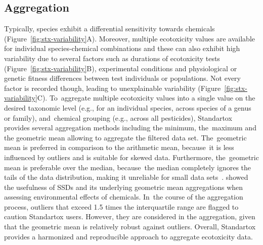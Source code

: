 \documentclass[data,datadescriptor,accept,moreauthors,pdftex]{Definitions/mdpi}
\begin{document}
\subsection{Aggregation}
Typically, species exhibit a differential sensitivity towards chemicals (Figure~\ref{fig:stx-variability}A). Moreover, multiple ecotoxicity values are available for individual species-chemical combinations and these can also exhibit high variability due to several factors such as durations of ecotoxicity tests (Figure~\ref{fig:stx-variability}B), experimental conditions and physiological or genetic fitness differences between test individuals or populations. Not every factor is recorded though, leading to unexplainable variability (Figure~\ref{fig:stx-variability}C). To~aggregate multiple ecotoxicity values into a single value on the desired taxonomic level (e.g., for an individual species, across species of a genus or family), and~chemical grouping (e.g., across all pesticides), Standartox provides several aggregation methods including the minimum, the~maximum and the geometric mean allowing to aggregate the filtered data set. The~geometric mean is preferred in comparison to the arithmetic mean, because~it is less influenced by outliers and is suitable for skewed data. Furthermore, the~geometric mean is preferable over the median, because~the median completely ignores the tails of the data distribution, making it unreliable for small data sets~\citep{leith_comparison_2010}. \citet{posthuma_species_2019} showed the usefulness of SSDs and its underlying geometric mean aggregations when assessing environmental effects of chemicals. In~the course of the aggregation process, outliers that exceed 1.5 times the interquartile range are flagged to caution Standartox users. However, they are considered in the aggregation, given that the geometric mean is relatively robust against outliers. Overall, Standartox provides a harmonized and reproducible approach to aggregate ecotoxicity data.
\end{document}
